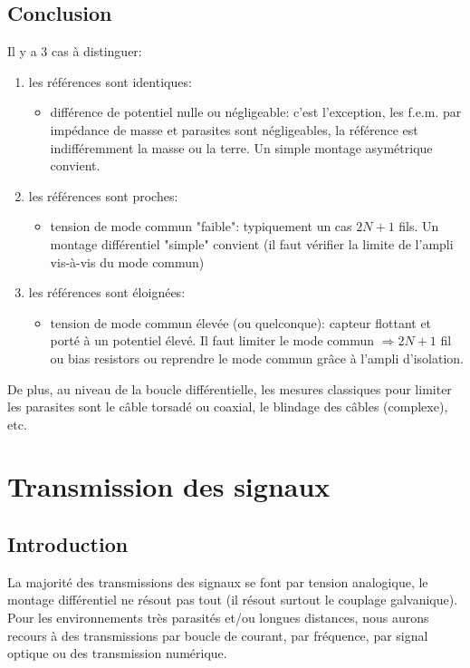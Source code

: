 \subsection{Conclusion}
Il y a 3 cas à distinguer:
\begin{enumerate}
	\item les références sont identiques:
	\begin{itemize}
		\item différence de potentiel nulle ou négligeable: c'est l'exception, les f.e.m. par impédance de masse et parasites sont négligeables, la référence est indifféremment la masse ou la terre. Un simple montage asymétrique convient.
	\end{itemize}
	\item les références sont proches:
	\begin{itemize}
		\item tension de mode commun "faible": typiquement un cas \(2N+1\) fils. Un montage différentiel "simple" convient (il faut vérifier la limite de l'ampli vis-à-vis du mode commun)
	\end{itemize}
	\item les références sont éloignées:
	\begin{itemize}
		\item tension de mode commun élevée (ou quelconque): capteur flottant et porté à un potentiel élevé. Il faut limiter le mode commun \(\Rightarrow 2N+1\) fil ou bias resistors ou reprendre le mode commun grâce à l'ampli d'isolation.
	\end{itemize}
\end{enumerate}
De plus, au niveau de la boucle différentielle, les mesures classiques pour limiter les parasites sont le câble torsadé ou coaxial, le blindage des câbles (complexe), etc.
\section{Transmission des signaux}
\subsection{Introduction}
La majorité des transmissions des signaux se font par tension analogique, le montage différentiel ne résout pas tout (il résout surtout le couplage galvanique). Pour les environnements très parasités et/ou longues distances, nous aurons recours à des transmissions par boucle de courant, par fréquence, par signal optique ou des transmission numérique.
